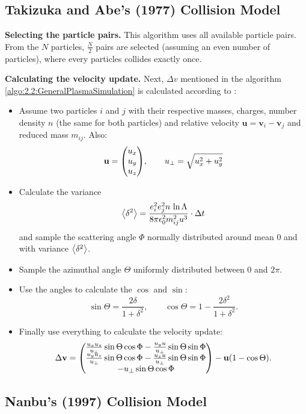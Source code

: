 \subsection{Takizuka and Abe's (1977) Collision Model}\label{sec:TA_updateEQ}

\textbf{Selecting the particle pairs.} This algorithm uses all available particle pairs. From the $N$ particles, $\frac{N}{2}$ pairs are selected (assuming an even number of particles), where every particles collides exactly once. 

\textbf{Calculating the velocity update.} Next, $\Delta v$ mentioned in the algorithm \ref{algo:2.2:GeneralPlasmaSimulation} is calculated according to \cite[4310]{Wang2008}:
\begin{itemize}
    \item Assume two particles $i$ and $j$ with their respective masses, charges, number density $n$ (the same for both particles) and relative velocity $\mathbf{u} = \mathbf{v}_i - \mathbf{v}_j$ and reduced mass $m_{ij}$. Also:
    $$
    \mathbf{u} = \mqty(u_x\\u_y\\u_z) ,
    \qquad u_\perp = \sqrt{u_x^2 + u_y^2}
    $$
    \item Calculate the variance
    $$
    \expval{\delta^2} = \frac{e_i^2e_j^2n \,\ln\Lambda}{8\pi\epsilon_0^2m_{ij}^2u^3} \cdot \Delta t
    $$
    and sample the scattering angle $\Phi$ normally distributed around mean 0 and with variance $\expval{\delta^2}$. 
    \item Sample the azimuthal angle $\Theta$ uniformly distributed between $0$ and $2\pi$.
    \item Use the angles to calculate the $\cos$ and $\sin$:
    $$
    \sin\Theta = \frac{2 \delta}{1 + \delta^2}, \qquad \cos\Theta = 1 - \frac{2 \delta^2}{1 + \delta^2}. 
    $$
    \item Finally use everything to calculate the velocity update:
    $$
    \Delta \mathbf{v} = \mqty(\frac{u_xu_z}{u_\perp}\sin\Theta\cos\Phi - \frac{u_yu}{u_\perp} \sin\Theta\sin\Phi \\
                              \frac{u_yu_z}{u_\perp}\sin\Theta\cos\Phi - \frac{u_xu}{u_\perp} \sin\Theta\sin\Phi \\
                              -u_\perp\sin\Theta\cos\Phi) 
                        - \mathbf{u} \qty(1 - \cos\Theta) .
    $$
\end{itemize}


\subsection{Nanbu's (1997) Collision Model}\label{sec:Nanbu_updateEQ}

